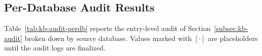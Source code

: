 \documentclass[letterpaper,journal]{IEEEtran}
\begin{document}
\subsection{Per-Database Audit Results}
\label{app:kb-stages}

Table~\ref{tab:kb-audit-perdb} reports the entry-level audit of Section~\ref{subsec:kb-audit} broken down by source database. Values marked with $[\cdot]$ are placeholders until the audit logs are finalized.

\begin{table}[!t]
\centering
\caption{Per-database distribution of audit labels for the LLM-inferred knowledge layers. Values marked with $[\cdot]$ are placeholders.}
\label{tab:kb-audit-perdb}
\small
\setlength{\tabcolsep}{3pt}
\end{table}

 







\vfill
\end{document}
